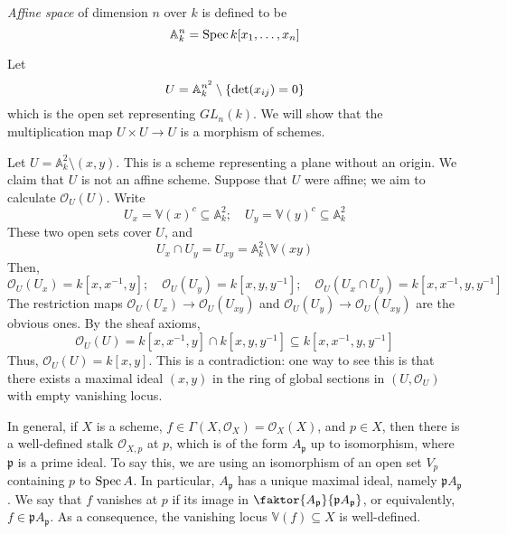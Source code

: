 \begin{definition}
    \emph{Affine space} of dimension \( n \) over \( k \) is defined to be
    \[ \mathbb A_k^n = \operatorname{Spec} k[x_1, \dots, x_n] \]
\end{definition}
\begin{example}
    Let
    \[ U = \mathbb A_k^{n^2} \setminus \qty{\det (x_{ij}) = 0} \]
    which is the open set representing \( GL_n(k) \).
    We will show that the multiplication map \( U \times U \to U \) is a morphism of schemes.
\end{example}
\begin{example}
    Let \( U = \mathbb A_k^2 \setminus (x, y) \).
    This is a scheme representing a plane without an origin.
    We claim that \( U \) is not an affine scheme.
    Suppose that \( U \) were affine; we aim to calculate \( \mathcal O_U(U) \).
    Write
    \[ U_x = \mathbb V(x)^c \subseteq \mathbb A_k^2;\quad U_y = \mathbb V(y)^c \subseteq \mathbb A_k^2 \]
    These two open sets cover \( U \), and
    \[ U_x \cap U_y = U_{xy} = \mathbb A_k^2 \setminus \mathbb V(xy) \]
    Then,
    \[ \mathcal O_U(U_x) = k[x,x^{-1},y];\quad \mathcal O_U(U_y) = k[x,y,y^{-1}];\quad \mathcal O_U(U_x \cap U_y) = k[x,x^{-1},y,y^{-1}] \]
    The restriction maps \( \mathcal O_U(U_x) \to \mathcal O_U(U_{xy}) \) and \( \mathcal O_U(U_y) \to \mathcal O_U(U_{xy}) \) are the obvious ones.
    By the sheaf axioms,
    \[ \mathcal O_U(U) = k[x,x^{-1},y] \cap k[x,y,y^{-1}] \subseteq k[x,x^{-1},y,y^{-1}] \]
    Thus, \( \mathcal O_U(U) = k[x,y] \).
    This is a contradiction: one way to see this is that there exists a maximal ideal \( (x, y) \) in the ring of global sections in \( (U, \mathcal O_U) \) with empty vanishing locus.

    In general, if \( X \) is a scheme, \( f \in \Gamma(X, \mathcal O_X) = \mathcal O_X(X) \), and \( p \in X \), then there is a well-defined stalk \( \mathcal O_{X,p} \) at \( p \), which is of the form \( A_{\mathfrak p} \) up to isomorphism, where \( \mathfrak p \) is a prime ideal.
    To say this, we are using an isomorphism of an open set \( V_p \) containing \( p \) to \( \operatorname{Spec} A \).
    In particular, \( A_{\mathfrak p} \) has a unique maximal ideal, namely \( \mathfrak p A_{\mathfrak p} \).
    We say that \( f \) vanishes at \( p \) if its image in \( \faktor{A_{\mathfrak p}}{\mathfrak p A_{\mathfrak p}} \), or equivalently, \( f \in \mathfrak p A_{\mathfrak p} \).
    As a consequence, the vanishing locus \( \mathbb V(f) \subseteq X \) is well-defined.
\end{example}

